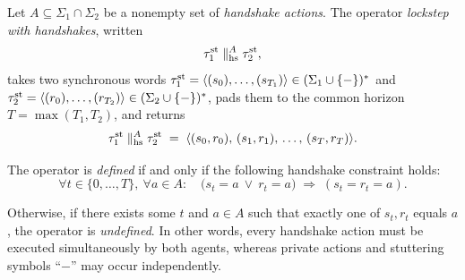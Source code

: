 \documentclass{article}
\begin{document}
  \begin{definition}
  Let $A\subseteq \Sigma_1\cap\Sigma_2$ be a nonempty set of \emph{handshake actions}.
  The operator \emph{lockstep with handshakes}, written
  \[
  \tau^{\mathrm{st}}_1 \parallel_{\mathrm{hs}}^{A} \tau^{\mathrm{st}}_2,
  \]
  takes two synchronous words
  \(\tau^{\mathrm{st}}_1=\langle (s_0),\dots,(s_{T_1}) \rangle \in(\Sigma_1\cup\{-\})^{*}\) and  
  \(\tau^{\mathrm{st}}_2=\langle (r_0),\dots,(r_{T_2}) \rangle \in(\Sigma_2\cup\{-\})^{*}\),
  pads them to the common horizon \(T=\max(T_1,T_2)\), and returns
  \[
  \tau^{\mathrm{st}}_1 \parallel_{\mathrm{hs}}^{A} \tau^{\mathrm{st}}_2
  \;=\;
  \langle (s_0,r_0),\,(s_1,r_1),\,\dots,\,(s_T,r_T) \rangle .
  \]
  
  \noindent The operator is \emph{defined} if and only if the following handshake constraint holds:
  \[
  \forall t\in\{0,\dots,T\},\ \forall a\in A:\quad
  \big(s_t=a\ \lor\ r_t=a\big)\;\Rightarrow\; (s_t=r_t=a).
  \]
  
  \noindent Otherwise, if there exists some $t$ and $a\in A$ such that exactly one of $s_t,r_t$ equals $a$, the operator is \emph{undefined}.
  In other words, every handshake action must be executed simultaneously by both agents,  
  whereas private actions and stuttering symbols “\(-\)” may occur independently.
  \end{definition}
  
\end{document}
